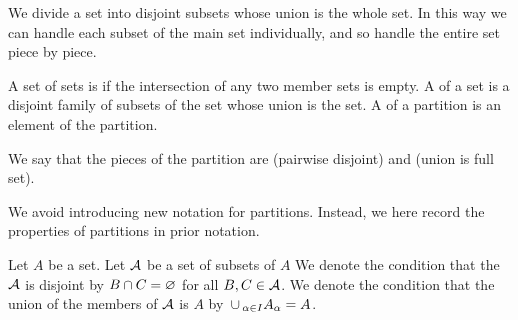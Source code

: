 
\sbasic












\sstart
{}


We divide a set into
disjoint subsets whose
union is the whole set.
In this way we can handle
each subset of the main set
individually, and so handle
the entire set piece by piece.


A set of sets is
if the intersection of any two
member sets is empty.
A  of
a set is a disjoint family of
subsets of the set
whose union is the set.
A
of a partition is an
element of the partition.

We say that the pieces
of the partition
are
 (pairwise disjoint)
and
 (union is full set).


We avoid introducing new notation
for partitions.
Instead,
we here record the properties
of partitions in prior notation.

Let $A$ be a set.
Let $\mathcal{A}$ be a set of
subsets of $A$
We denote the condition that
the $\mathcal{A}$ is disjoint by
$B \cap C = \varnothing$ for all
$B, C \in \mathcal{A}$.
We denote the condition that the union
of the members of $\mathcal{A}$ is $A$ by
$\,\cup\,_{\alpha \in I} A_{\alpha} = A$.

\strats
\strats
